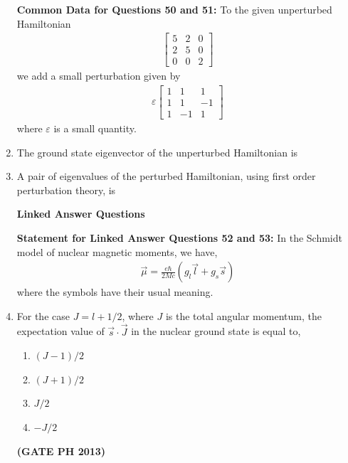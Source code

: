 \documentclass[14pt, a4paper]{extarticle}
\renewcommand{\vec}[1]{\overrightarrow{#1}}
\newcommand{\myvec}[1]{\begin{bmatrix} #1 \end{bmatrix}}
\begin{document}
\begin{enumerate}[label=\textbf{Q. \arabic*}]
\textbf{Common Data for Questions 50 and 51:} To the given unperturbed Hamiltonian
\begin{align*}
\myvec{5 & 2 & 0 \\ 2 & 5 & 0 \\ 0 & 0 & 2}
\end{align*}
we add a small perturbation given by
\begin{align*}
\varepsilon \myvec{1 & 1 & 1 \\ 1 & 1 & -1 \\ 1 & -1 & 1}
\end{align*}
where $\varepsilon$ is a small quantity.

\item The ground state eigenvector of the unperturbed Hamiltonian is
\begin{enumerate}
\end{enumerate}

\item A pair of eigenvalues of the perturbed Hamiltonian, using first order perturbation theory, is
\begin{enumerate}
\end{enumerate}

\textbf{Linked Answer Questions}

\textbf{Statement for Linked Answer Questions 52 and 53:} In the Schmidt model of nuclear magnetic moments, we have,
\begin{align*}
 \vec{\mu} = \frac{e\hbar}{2Mc}(g_l \vec{l} + g_s \vec{s})
\end{align*}
where the symbols have their usual meaning.

\item For the case $J = l + 1/2$, where $J$ is the total angular momentum, the expectation value of $\vec{s} \cdot \vec{J}$ in the nuclear ground state is equal to,
    \begin{multicols}{4}
        \begin{enumerate}
            \item $(J-1)/2$
            \item $(J+1)/2$
            \item $J/2$
            \item $-J/2$
        \end{enumerate}
    \end{multicols}
    \hfill \textbf{(GATE PH 2013)}


\end{enumerate}
\end{document}
